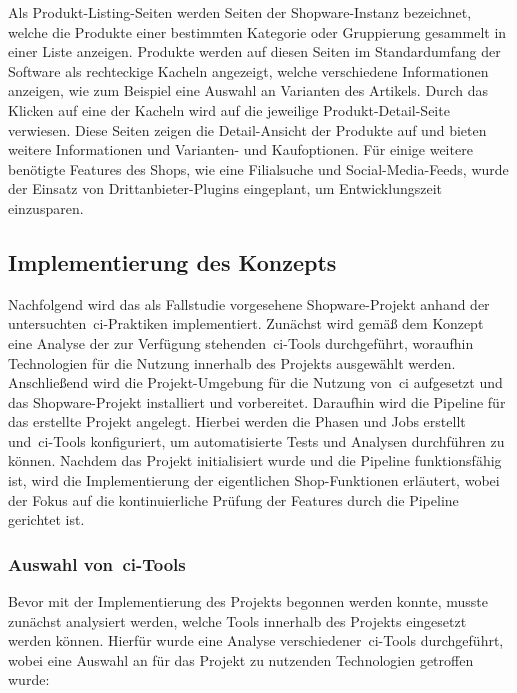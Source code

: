 Als Produkt-Listing-Seiten werden Seiten der Shopware-Instanz bezeichnet, welche die Produkte einer bestimmten
Kategorie oder Gruppierung gesammelt in einer Liste anzeigen.
Produkte werden auf diesen Seiten im Standardumfang der Software als rechteckige Kacheln angezeigt, welche
verschiedene Informationen anzeigen, wie zum Beispiel eine Auswahl an Varianten des Artikels.
Durch das Klicken auf eine der Kacheln wird auf die jeweilige Produkt-Detail-Seite verwiesen.
Diese Seiten zeigen die Detail-Ansicht der Produkte auf und bieten weitere Informationen und Varianten- und
Kaufoptionen.
Für einige weitere benötigte Features des Shops, wie eine Filialsuche und Social-Media-Feeds, wurde der Einsatz von
Drittanbieter-Plugins eingeplant, um Entwicklungszeit einzusparen.

\subsection{Implementierung des Konzepts} \label{subsec:04-implementation-2}

Nachfolgend wird das als Fallstudie vorgesehene Shopware-Projekt anhand der untersuchten\ \acrshort{ci}-Praktiken
implementiert.
Zunächst wird gemäß dem Konzept eine Analyse der zur Verfügung stehenden\ \acrshort{ci}-Tools durchgeführt,
woraufhin Technologien für die Nutzung innerhalb des Projekts ausgewählt werden.
Anschließend wird die Projekt-Umgebung für die Nutzung von\ \acrshort{ci} aufgesetzt und das Shopware-Projekt
installiert und vorbereitet.
Daraufhin wird die Pipeline für das erstellte Projekt angelegt.
Hierbei werden die Phasen und Jobs erstellt und\ \acrshort{ci}-Tools konfiguriert, um automatisierte Tests und Analysen
durchführen zu können.
Nachdem das Projekt initialisiert wurde und die Pipeline funktionsfähig ist, wird die Implementierung der eigentlichen
Shop-Funktionen erläutert, wobei der Fokus auf die kontinuierliche Prüfung der Features durch die Pipeline gerichtet
ist.

\subsubsection{Auswahl von\ \acrshort{ci}-Tools}

Bevor mit der Implementierung des Projekts begonnen werden konnte, musste zunächst analysiert werden, welche Tools
innerhalb des Projekts eingesetzt werden können.
Hierfür wurde eine Analyse verschiedener\ \acrshort{ci}-Tools durchgeführt, wobei eine Auswahl an für das
Projekt zu nutzenden Technologien getroffen wurde:\\

